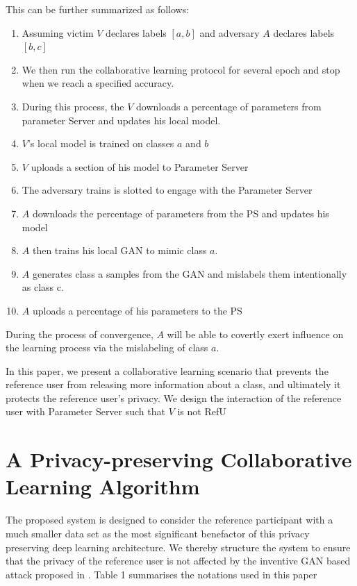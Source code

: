 \documentclass[conference]{IEEEtran}
\begin{document}
This can be further summarized as follows:
\begin {enumerate}
\item Assuming victim $V$ declares labels $[a,b]$ and adversary $A$ declares labels $[b,c]$
\item We then run the collaborative learning protocol for several epoch and stop when we reach a specified accuracy.
\item During this process, the $V$ downloads a percentage of parameters from parameter Server and updates his local model.
\item $V$'s local model is trained on classes $a$ and $b$
\item $V$ uploads a section of his model to Parameter Server
\item The adversary trains is slotted to engage with the Parameter Server
\item $A$ downloads the percentage of parameters from the PS and updates his model
\item $A$ then trains his local GAN to mimic class $a$.
\item $A$ generates class a samples from the GAN and mislabels them intentionally as class c.
\item $A$ uploads a percentage of his parameters to the PS
\end {enumerate}
During the process of convergence, $A$ will be able to covertly exert influence on the learning process via the mislabeling of class
$a$.

In this paper, we present a collaborative learning scenario that prevents the reference user from releasing more
information about a class, and ultimately it protects the reference user's privacy. We design the interaction of the reference user
with Parameter Server such that $V$ is not RefU

\section{A Privacy-preserving Collaborative Learning Algorithm}

The proposed system is designed to consider the reference participant with a much smaller data set as the most significant benefactor
of this privacy preserving deep learning architecture. We thereby structure the system to ensure that the privacy of the reference user
is not affected by the inventive GAN based attack proposed in \cite{hitaj2017deep}. Table 1 summarises the notations used in this paper
\end{document}
